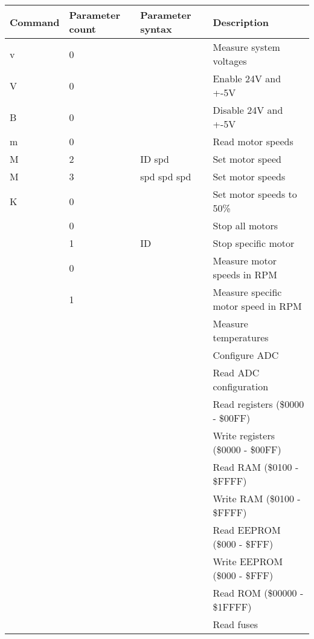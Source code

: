\documentclass{article}
\begin{document}
\begin{table}[H]
\begin{centering}
\begin{tabular}{|p{1.8cm}|p{1.8cm}|p{1.8cm}|p{5cm}|}
\hline
{\bf Command} & {\bf Parameter count} & {\bf Parameter syntax} & {\bf Description} \\ \hline
v & 0 &                     & Measure system voltages \\ \hline
V & 0 &                     & Enable 24V and +-5V \\ \hline
B & 0 &                     & Disable 24V and +-5V \\ \hline
m & 0 &                     & Read motor speeds \\ \hline
M & 2 & ID spd              & Set motor speed \\ \hline
M & 3 & spd spd spd         & Set motor speeds \\ \hline
K & 0 &                     & Set motor speeds to 50\% \\ \hline
  & 0 &                     & Stop all motors \\ \hline
  & 1 & ID                  & Stop specific motor \\ \hline
  & 0 &                     & Measure motor speeds in RPM \\ \hline
  & 1 &                     & Measure specific motor speed in RPM \\ \hline
  &   &                     & Measure temperatures \\ \hline
  &   &                     & Configure ADC \\ \hline
  &   &                     & Read ADC configuration \\ \hline
  &   &                     & Read registers (\$0000 - \$00FF) \\ \hline
  &   &                     & Write registers (\$0000 - \$00FF) \\ \hline
  &   &                     & Read RAM (\$0100 - \$FFFF) \\ \hline
  &   &                     & Write RAM (\$0100 - \$FFFF) \\ \hline
  &   &                     & Read EEPROM (\$000 - \$FFF) \\ \hline
  &   &                     & Write EEPROM (\$000 - \$FFF) \\ \hline
  &   &                     & Read ROM (\$00000 - \$1FFFF) \\ \hline
  &   &                     & Read fuses \\ \hline

\end{tabular}
\end{centering}
\end{table}
\end{document}
